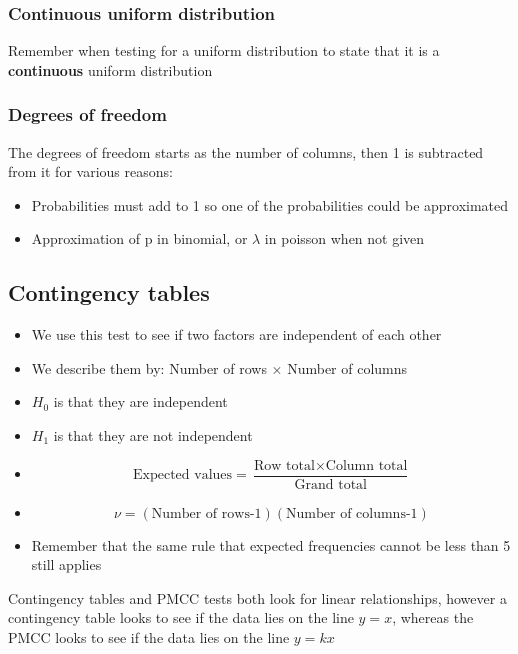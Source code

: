 \documentclass{article}[18pt]
\begin{document}
\subsubsection{Continuous uniform distribution}
Remember when testing for a uniform distribution to state that it is a \textbf{continuous} uniform distribution
\subsubsection{Degrees of freedom}
The degrees of freedom starts as the number of columns, then 1 is subtracted from it for various reasons:
\begin{itemize}
\item Probabilities must add to 1 so one of the probabilities could be approximated
\item Approximation of p in binomial, or $\lambda$ in poisson when not given
\end{itemize}
\newpage
\subsection{Contingency tables}
\begin{itemize}
\item We use this test to see if two factors are independent of each other
\item We describe them by: Number of rows $\times$ Number of columns
\item $H_0$ is that they are independent
\item $H_1$ is that they are not independent
\item $$\textrm{Expected values}=\frac{\textrm{Row total}\times\textrm{Column total}}{\textrm{Grand total}}$$
\item $$\nu=(\textrm{Number of rows-1})(\textrm{Number of columns-1})$$
\item Remember that the same rule that expected frequencies cannot be less than 5 still applies
\end{itemize}
Contingency tables and PMCC tests both look for linear relationships, however a contingency table looks to see if the data lies on the line $y=x$, whereas the PMCC looks to see if the data lies on the line $y=kx$
\end{document}
